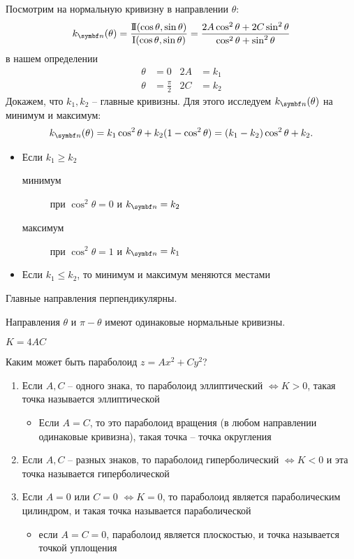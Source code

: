 \documentclass[main]{subfiles}
\begin{document}
Посмотрим на нормальную кривизну в направлении $\theta$:
\[k_{\vn} (\theta) = \frac{\sff(\cos \theta, \sin \theta)}{\fff(\cos \theta, \sin \theta)} = \frac{2A \cos^2 \theta + 2C \sin^2 \theta}{\cos^2\theta + \sin^2 \theta}\]
в нашем определении
\begin{align*}
    \theta & = 0             & 2A & = k_1 \\
    \theta & = \frac{\pi}{2} & 2C & = k_2
\end{align*}
Докажем, что $k_1, k_2$ -- главные кривизны.
Для этого исследуем $k_{\vn}(\theta)$ на минимум и максимум:
\begin{gather*}
    k_{\vn}(\theta) = k_1 \cos^2 \theta + k_2(1- \cos^2 \theta) = (k_1 - k_2) \cos^2 \theta + k_2.
\end{gather*}
\begin{itemize}
    \item Если $k_1 \ge k_2$
          \begin{description}
              \item[минимум] при $\cos^2\theta = 0$ и $k_{\vn} = k_2$
              \item[максимум] при $\cos^2\theta = 1$ и $k_{\vn} = k_1$
          \end{description}
    \item Если $k_1 \le k_2$, то минимум и максимум меняются местами
\end{itemize}
\begin{corollary}
    Главные направления перпендикулярны.
\end{corollary}
\begin{corollary}
    Направления $\theta$ и $\pi - \theta$ имеют одинаковые нормальные кривизны.
\end{corollary}

\begin{remark}
    $K = 4AC$
\end{remark}
Каким может быть параболоид $z = Ax^2 + Cy^2$?


\begin{enumerate}
    \item Если $A, C$ -- одного знака, то параболоид эллиптический $\Leftrightarrow K > 0$, такая точка называется эллиптической
          \begin{itemize}
              \item Если $A=C$, то это параболоид вращения (в любом направлении одинаковые кривизна), такая точка -- точка округления
          \end{itemize}
    \item Если $A,C$ -- разных знаков, то параболоид гиперболический $\Leftrightarrow K < 0$ и эта точка называется гиперболической
    \item Если $A =0$ или $C=0$ $\Leftrightarrow K = 0$, то параболоид является параболическим цилиндром, и такая точка называется параболической
          \begin{itemize}
              \item если $A = C = 0$, параболоид является плоскостью, и точка называется точкой уплощения
          \end{itemize}
\end{enumerate}
\end{document}
